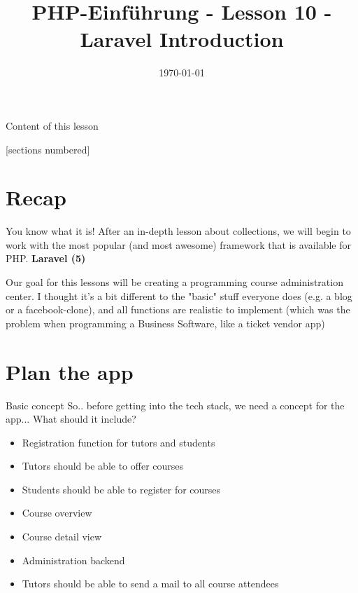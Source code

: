 


\newcommand{\topic}{
	PHP-Einführung - Lesson 10 - Laravel Introduction
}

\title{\topic}
\date{\today}



\maketitle

\begin{frame}{Content of this lesson}

	[sections numbered]
	\tableofcontents

\end{frame}

\section{Recap}

\begin{frame}{You know what it is!}
	After an in-depth lesson about collections, we will begin to work with the most popular (and most awesome) framework that is available for PHP. \pause \textbf{Laravel (5)} \pause
	
	Our goal for this lessons will be creating a programming course administration center. I thought it's a bit different to the "basic" stuff everyone does (e.g. a blog or a facebook-clone), and all functions are realistic to implement (which was the problem when programming a Business Software, like a ticket vendor app)
\end{frame}

\section{Plan the app}

\begin{frame}{Basic concept}
	So.. before getting into the tech stack, we need a concept for the app... What should it include?\pause
	\begin{itemize}
		\item Registration function for tutors and students \pause			
		\item Tutors should be able to offer courses \pause	
		\item Students should be able to register for courses \pause
		\item Course overview \pause			
		\item Course detail view\pause	
		\item Administration backend \pause	
		\item Tutors should be able to send a mail to all course attendees 
	\end{itemize}
\end{frame}


